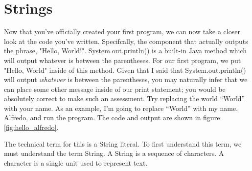 

\chapter{Strings}


Now that you've officially created your first program, we can now take a closer look at the code you've written.
Specifcally, the component that actually outputs the phrase, "Hello, World!".
System.out.println() is a built-in Java method which will output whatever is between the parentheses.
For our first program, we put "Hello, World" inside of this method.
Given that I said that System.out.println() will output \textit{whatever} is between the parentheses, you may naturally infer that we can place some other message inside of our print statement; you would be absolutely correct to make such an assessment.
Try replacing the world ``World'' with your name.
As an example, I'm going to replace ``World'' with my name, Alfredo, and run the program.
The code and output are shown in figure \ref{fig:hello_alfredo}.

The technical term for this is a \gls{String literal}.
To first understand this term, we must understand the term \gls{String}.
A String is a sequence of characters.
A \gls{character} is a single unit used to represent text.




